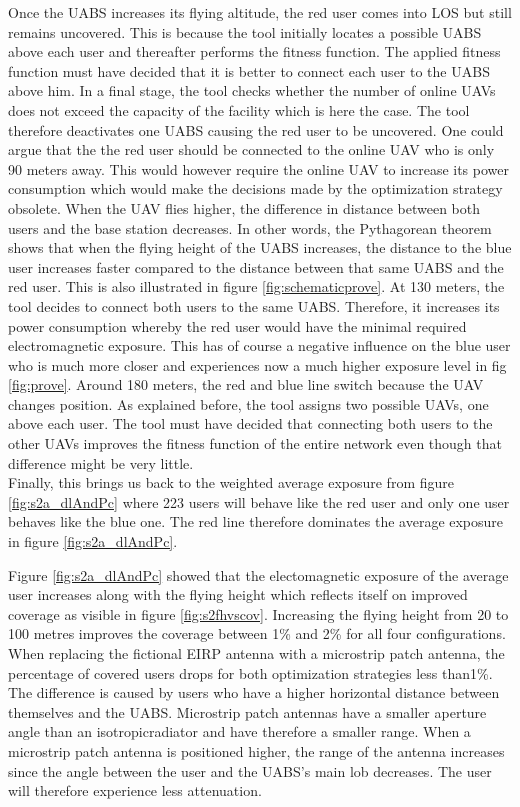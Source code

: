 Once the \gls{UABS} increases its flying altitude, the red user comes into \gls{LOS} but still remains uncovered. This is because the tool initially locates a possible 
\gls{UABS} above each user and thereafter performs the  fitness function. The applied fitness function must have decided that it is better to connect 
each user to the \gls{UABS} above him. In a final stage, the tool checks whether the number of online \gls{UAV}s does not exceed the capacity of the facility
which is here the case. The tool therefore deactivates one \gls{UABS} causing the red user to be uncovered. One could argue that the 
the red user should be connected to the online \gls{UAV} who is only 90 meters away. This would however require the online \gls{UAV} to increase its power consumption which 
would make the decisions made by the optimization strategy obsolete.
When the \gls{UAV} flies higher, the difference in distance between both users and the base station decreases. In other words, the Pythagorean theorem shows that when the flying height of the 
\gls{UABS} increases, the distance to the blue user increases faster compared to the distance between that same \gls{UABS} and the red user. This is also illustrated in 
figure \ref{fig:schematicprove}.
At 130 meters, the tool decides to connect both users to the same \gls{UABS}. Therefore, it increases its power consumption whereby the red user would  have the minimal 
required electromagnetic exposure. This has of course a negative influence on the blue user who is much more closer and experiences now a much higher exposure level in fig \ref{fig:prove}.
Around 180 meters, the  red and blue line switch because the \gls{UAV} changes position. As explained before, the tool assigns two possible \gls{UAV}s, one above 
each user. The tool must have decided that connecting both users to the other \gls{UAV}s improves the fitness function of the entire network even though that difference might be 
very little. \\
Finally, this brings us back to the weighted average exposure from figure \ref{fig:s2a_dlAndPc} where 223 users will behave like the  red user and only
one user behaves like the blue one. 
The red line therefore dominates the average exposure in figure \ref{fig:s2a_dlAndPc}.

Figure \ref{fig:s2a_dlAndPc} showed that the electomagnetic exposure of the average user increases along with the flying height
which reflects itself on improved coverage as visible in figure  \ref{fig:s2fhvscov}.
Increasing the flying height from 20 to 100 metres improves the coverage between 1\% and 2\% for all four configurations.
When replacing the fictional \gls{EIRP} antenna with a microstrip patch antenna, the percentage of covered users drops for both 
optimization strategies less than1\%. 
The difference is caused by users who have a higher horizontal distance between themselves and the \gls{UABS}. Microstrip 
patch antennas have a smaller aperture angle than an \gls{isotropicradiator} and have therefore a smaller range.
When a microstrip patch antenna is positioned higher, the range of the antenna increases 
since the angle between the user and the \gls{UABS}'s main lob decreases. The user will therefore experience less attenuation.

